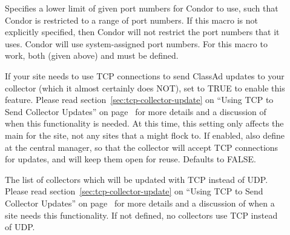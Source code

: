 \begin{description}
\item[] \label{param:LowPort}
  Specifies a lower limit of given port numbers for Condor to use,
  such that Condor is restricted to a range of port numbers.
  If this macro is not explicitly specified, then Condor will
  not restrict the port numbers that it uses. Condor will use
  system-assigned port numbers.
  For this macro to work, both  (given above) and
   must be defined.

\item[]
  \label{param:UpdateCollectorWithTcp}
  If your site needs to use TCP connections to send ClassAd updates to
  your collector (which it almost certainly does NOT), set to TRUE
  to enable this feature.
  Please read section~\ref{sec:tcp-collector-update} on ``Using TCP to
  Send Collector Updates'' on page~\pageref{sec:tcp-collector-update}
  for more details and a discussion of when this
  functionality is needed. 
  At this time, this setting only affects the main 
  for the site, not any sites that a  might flock to. 
  If enabled, also define
   at the central manager, so
  that the collector will accept TCP connections for updates, and will
  keep them open for reuse.
  Defaults to FALSE.

\item[]
  \label{param:TcpUpdateCollectors}
  The list of collectors which will be updated with TCP instead of UDP.
  Please read section~\ref{sec:tcp-collector-update} on ``Using TCP to
  Send Collector Updates'' on page~\pageref{sec:tcp-collector-update}
  for more details and a discussion of when a site needs this
  functionality. 
  If not defined, no collectors use TCP instead of UDP.

\end{description}

